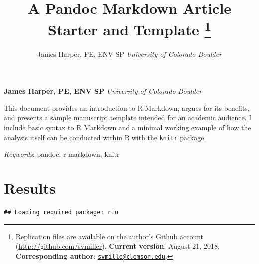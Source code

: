 \documentclass[11pt,]{article}
\title{A Pandoc Markdown Article Starter and Template \thanks{Replication files are available on the author's Github account
(\url{http://github.com/svmiller}). \textbf{Current version}: August 21,
2018; \textbf{Corresponding author}:
\href{mailto:svmille@clemson.edu}{\nolinkurl{svmille@clemson.edu}}.}  }
\author{\Large James Harper, PE, ENV SP\vspace{0.05in} \newline\normalsize\emph{University of Colorado Boulder}  }
\date{}
\newcommand*{\authorfont}{\fontfamily{phv}\selectfont}
\renewenvironment{abstract}
 {{%
    \setlength{\leftmargin}{0mm}
    \setlength{\rightmargin}{\leftmargin}%
  }%
  \relax}
 {\endlist}
\begin{document}
	
%

{%
\setlength{\parindent}{0pt}
\thispagestyle{plain}
{\fontsize{18}{20}\selectfont\raggedright 
\maketitle  %

}

{
   \vskip 13.5pt\relax \normalsize\fontsize{11}{12} 
\textbf{\authorfont James Harper, PE, ENV SP} \hskip 15pt \emph{\small University of Colorado Boulder}   

}

}








\begin{abstract}

    \hbox{\vrule height .2pt width 39.14pc}

    \vskip 8.5pt %

\noindent This document provides an introduction to R Markdown, argues for its
benefits, and presents a sample manuscript template intended for an
academic audience. I include basic syntax to R Markdown and a minimal
working example of how the analysis itself can be conducted within R
with the \texttt{knitr} package.


\vskip 8.5pt \noindent \emph{Keywords}: pandoc, r markdown, knitr \par

    \hbox{\vrule height .2pt width 39.14pc}



\end{abstract}


\vskip 6.5pt


\noindent  \hypertarget{results}{%
\section{Results}\label{results}}



\begin{verbatim}
## Loading required package: rio
\end{verbatim}
\end{document}
